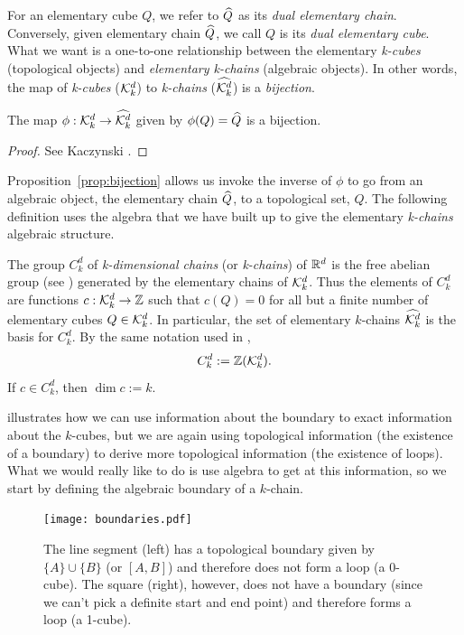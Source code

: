 For an elementary cube $Q$, we refer to $\widehat{Q}$ as its \textit{dual elementary chain}. Conversely, given elementary chain $\widehat{Q}$, we call $Q$ is its \textit{dual elementary cube}. What we want is a one-to-one relationship between the elementary \textit{k-cubes} (topological objects) and \textit{elementary k-chains} (algebraic objects). In other words, the map of \textit{k-cubes} ($\mathcal{K}^{d}_k$) to \textit{k-chains} ($\widehat{\mathcal{K}^{d}_k}$) is a \textit{bijection}. 
%
\begin{prop} \label{prop:bijection}
	The map $\phi : \mathcal{K}^{d}_k \rightarrow \widehat{\mathcal{K}^{d}_k}$ given by $\phi(Q) = \widehat{Q}$ is a bijection.
\end{prop}
%
\begin{proof}
	See Kaczynski \etal{}.
\end{proof}

Proposition~\ref{prop:bijection} allows us invoke the inverse of $\phi$ to go from an algebraic object, the elementary chain $\widehat{Q}$, to a topological set, $Q$. The following definition uses the algebra that we have built up to give the elementary \textit{k-chains} algebraic structure.
%
\begin{defn}
	The group $C_k^d$ of \textit{k-dimensional chains} (or \textit{k-chains}) of $\mathbb{R}^d$ is the free abelian group (see ) generated by the elementary chains of $\mathcal{K}^{d}_k$. Thus the elements of $C_k^d$ are functions $c : \mathcal{K}^{d}_k \rightarrow \mathbb{Z}$ such that $c(Q) = 0$ for all but a finite number of elementary cubes $Q \in \mathcal{K}^{d}_k$. In particular, the set of elementary $k$-chains $\widehat{\mathcal{K}^{d}_k}$ is the basis for $C_k^d$. By the same notation used in ,
	$$ C_k^d := \mathbb{Z}(\mathcal{K}^{d}_k). $$
	If $ c \in C_k^d$, then $\dim c := k$.
\end{defn}

 illustrates how we can use information about the boundary to exact information about the $k$-cubes, but we are again using topological information (the existence of a boundary) to derive more topological information (the existence of loops). What we would really like to do is use algebra to get at this information, so we start by defining the algebraic boundary of a $k$-chain.
%
\begin{figure}[h]
	\begin{center}
	\texttt{[image: boundaries.pdf]}
	\caption{\label{fig:boundaries} The line segment (left) has a topological boundary given by $\{ A \} \cup \{ B \}$ (or $[A, B]$) and therefore does not form a loop (a 0-cube). The square (right), however, does not have a boundary (since we can't pick a definite start and end point) and therefore forms a loop (a 1-cube).}
	\end{center}
\end{figure}

